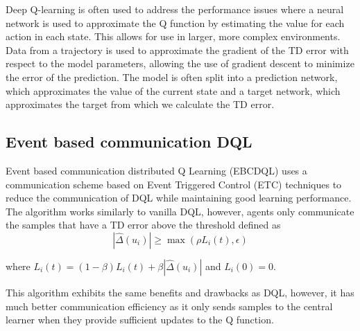 Deep Q-learning is often used to address the performance issues where a neural network is used to approximate the Q function by estimating the value for each action in each state. This allows for use in larger, more complex environments. Data from a trajectory is used to approximate the gradient of the TD error with respect to the model parameters, allowing the use of gradient descent to minimize the error of the prediction. The model is often split into a prediction network, which approximates the value of the current state and a target network, which approximates the target from which we calculate the TD error.

\subsection{Event based communication DQL}
Event based communication distributed Q Learning (EBCDQL) \cite{EBCDQL} uses a communication scheme based on Event Triggered Control (ETC) \cite{ETC} techniques to reduce the communication of DQL while maintaining good learning performance.
The algorithm works similarly to vanilla DQL, however, agents only communicate the samples that have a TD error above the threshold defined as 
\begin{equation*}
    |\hat{\Delta}(u_i)| \geq \max(\rho L_i(t), \epsilon) 
\end{equation*}

where $L_i(t) = (1-\beta)L_i(t)+ \beta |\hat{\Delta}(u_i)|$ and $L_i(0)=0$.

This algorithm exhibits the same benefits and drawbacks as DQL, however, it has much better communication efficiency as it only sends samples to the central learner when they provide sufficient updates to the Q function.

